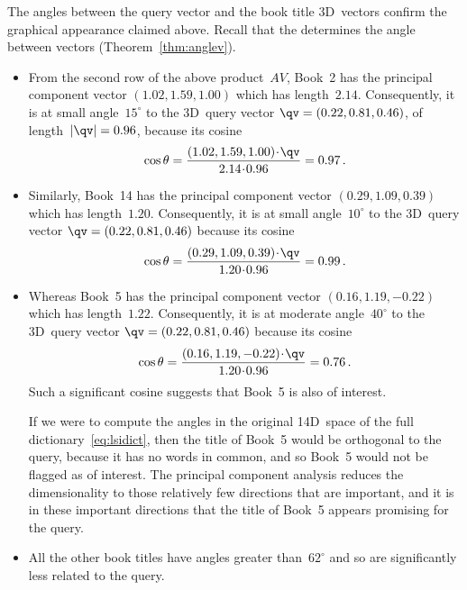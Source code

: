 The angles between the query vector and the book title 3D~vectors confirm the graphical appearance claimed above.
Recall that the  determines the angle between vectors (Theorem~\ref{thm:anglev}).
\begin{itemize}
\item From the second row of the above product~\(AV\), Book~2 has the principal component vector \((1.02,1.59,1.00)\) which has length~\(2.14\).
Consequently, it is at small angle~\(15^\circ\) to the 3D~query vector \(\qv=(0.22,0.81,0.46)\), of length~\(|\qv|=0.96\), because its cosine
\begin{equation*}
\cos\theta=\frac{(1.02,1.59,1.00)\cdot\qv}{2.14\cdot0.96}
=0.97\,.
\end{equation*}

\item Similarly, Book~14 has the principal component vector \((0.29,1.09,0.39)\) which has length~\(1.20\).
Consequently, it is at small angle~\(10^\circ\) to the 3D~query vector \(\qv=(0.22,0.81,0.46)\) because its cosine
\begin{equation*}
\cos\theta=\frac{(0.29,1.09,0.39)\cdot\qv}{1.20\cdot0.96}
=0.99\,.
\end{equation*}

\item Whereas Book~5 has the principal component vector \((0.16,1.19,-0.22)\) which has length~\(1.22\).
Consequently, it is at moderate angle~\(40^\circ\) to the 3D~query vector \(\qv=(0.22,0.81,0.46)\) because its cosine
\begin{equation*}
\cos\theta=\frac{(0.16,1.19,-0.22)\cdot\qv}{1.20\cdot0.96}
=0.76\,.
\end{equation*}
Such a significant cosine suggests that Book~5 is also of interest.

If we were to compute the angles in the original 14D~space of the full dictionary~\eqref{eq:lsidict}, then the title of Book~5 would be orthogonal to the query, because it has no words in common, and so Book~5 would not be flagged as of interest.
The principal component analysis reduces the dimensionality to those relatively few directions that are important, and it is in these important directions that the title of Book~5 appears promising for the query.

\item All the other book titles have angles greater than~\(62^\circ\) and so are significantly less related to the query.
\end{itemize}



